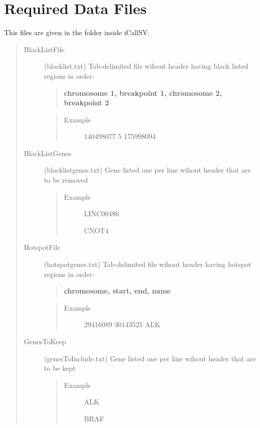 \documentclass[letterpaper,10pt,english]{sphinxmanual}
\begin{document}
\section{Required Data Files}
\label{iCallSV:required-data-files}
This files are given in the  folder inside iCallSV.
\begin{quote}\begin{description}
\item[{BlackListFile}] \leavevmode
(blacklist.txt) Tab-delimited file wihout header having black listed regions in order:
\begin{quote}

\textbf{chromosome 1, breakpoint 1, chromosome 2, breakpoint 2}
\end{quote}
\begin{quote}\begin{description}
\item[{Example}]        140498077       5       175998094

\end{description}\end{quote}

\item[{BlackListGenes}] \leavevmode
(blacklistgenes.txt) Gene listed one per line wihout header that are to be removed
\begin{quote}\begin{description}
\item[{Example}] \leavevmode
LINC00486

CNOT4

\end{description}\end{quote}

\item[{HotspotFile}] \leavevmode
(hotspotgenes.txt) Tab-delimited file wihout header having hotspot regions in order:
\begin{quote}

\textbf{chromosome, start, end, name}
\end{quote}
\begin{quote}\begin{description}
\item[{Example}]        29416089        30143525        ALK

\end{description}\end{quote}

\item[{GenesToKeep}] \leavevmode
(genesToInclude.txt) Gene listed one per line wihout header that are to be kept
\begin{quote}\begin{description}
\item[{Example}] \leavevmode
ALK

BRAF

\end{description}\end{quote}

\end{description}\end{quote}
\end{document}

